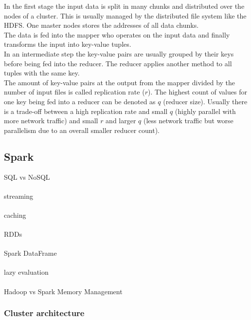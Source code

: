 \noindent In the first stage the input data is split in many chunks and distributed over the nodes of a cluster. This is usually managed by the distributed file system like the HDFS. One master nodes stores the addresses of all data chunks.\\
The data is fed into the mapper who operates on the input data and finally transforms the input into key-value tuples.\\
In an intermediate step the key-value pairs are usually grouped by their keys before being fed into the reducer. The reducer applies another method to all tuples with the same key.\\
The amount of key-value pairs at the output from the mapper divided by the number of input files is called replication rate ($r$). The highest count of values for one key being fed into a reducer can be denoted as $q$ (reducer size). Usually there is a trade-off between a high replication rate and small $q$ (highly parallel with more network traffic) and small $r$ and larger $q$ (less network traffic but worse parallelism due to an overall smaller reducer count).

\subsection{Spark}

SQL vs NoSQL\\
\ \\
streaming\\
\ \\
caching\\
\ \\
RDDs\\
\ \\
Spark DataFrame\\
\ \\
lazy evaluation\\
\ \\
Hadoop vs Spark Memory Management\\

\subsubsection{Cluster architecture}

